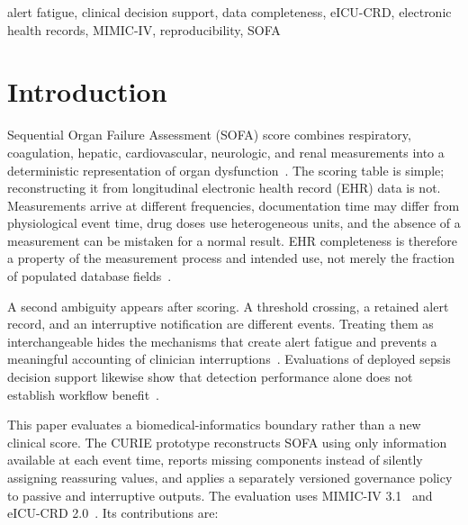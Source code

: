 \documentclass[journal]{IEEEtran}
\newcommand{\systemname}{CURIE}
\begin{document}
\begin{IEEEkeywords}
alert fatigue, clinical decision support, data completeness, eICU-CRD,
electronic health records, MIMIC-IV, reproducibility, SOFA
\end{IEEEkeywords}

\section{Introduction}

 Sequential Organ Failure Assessment (SOFA) score combines
respiratory, coagulation, hepatic, cardiovascular, neurologic, and renal
measurements into a deterministic representation of organ
dysfunction~\cite{vincent1996sofa}. The scoring table is simple;
reconstructing it from longitudinal electronic health record (EHR) data is
not. Measurements arrive at different frequencies, documentation time may
differ from physiological event time, drug doses use heterogeneous units, and
the absence of a measurement can be mistaken for a normal result. EHR
completeness is therefore a property of the measurement process and intended
use, not merely the fraction of populated database
fields~\cite{weiskopf2013,kahn2016}.

A second ambiguity appears after scoring. A threshold crossing, a retained
alert record, and an interruptive notification are different events. Treating
them as interchangeable hides the mechanisms that create alert fatigue and
prevents a meaningful accounting of clinician
interruptions~\cite{embi2012,elias2019,ancker2017}. Evaluations of deployed
sepsis decision support likewise show that detection performance alone does
not establish workflow benefit~\cite{downing2019,wong2021}.

This paper evaluates a biomedical-informatics boundary rather than a new
clinical score. The \systemname{} prototype reconstructs SOFA using only
information available at each event time, reports missing components instead
of silently assigning reassuring values, and applies a separately versioned
governance policy to passive and interruptive outputs. The evaluation uses
MIMIC-IV 3.1~\cite{mimiciv31,johnson2023mimiciv} and eICU-CRD
2.0~\cite{eicu20,pollard2018eicu}. Its contributions are:
\end{document}
